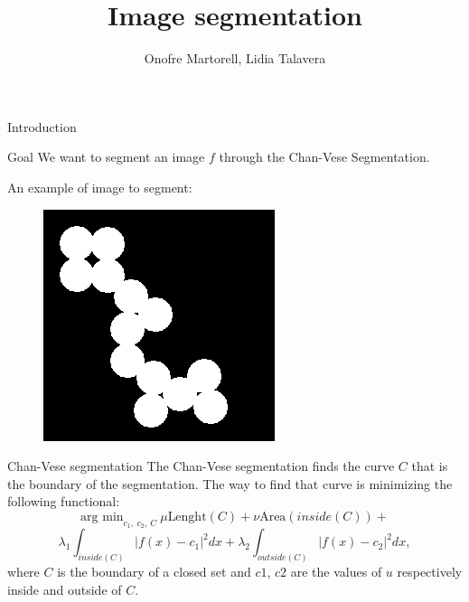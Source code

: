 \documentclass[11pt]{beamer}
\author{Onofre Martorell, Lidia Talavera}
\title{Image segmentation}
\begin{document}
\begin{frame}
\titlepage
\end{frame}


\begin{frame}{Introduction}

\begin{block}{Goal}
We want to segment an image $f$ through the Chan-Vese Segmentation.
\end{block}
An example of image to segment:
\begin{figure}
\includegraphics[scale=0.4]{circles}
\end{figure}
\end{frame}

\begin{frame}{Chan-Vese segmentation}
The Chan-Vese segmentation finds the curve $C$ that is the boundary of the segmentation. The way to find that curve is minimizing the following functional:
$$\text{arg min}_{c_1,\ c_2,\ C }\ \mu \text{Lenght}(C) +\nu\text{Area}(inside(C)) +$$$$ \lambda_1\int_{inside(C)}|f(x)-c_1|^2dx + \lambda_2\int_{outside(C)}|f(x)-c_2|^2dx,$$
where $C$ is the boundary of a closed set and $c1$, $c2$ are the values of $u$ respectively inside and outside of $C$. 
\end{frame}
\end{document}
